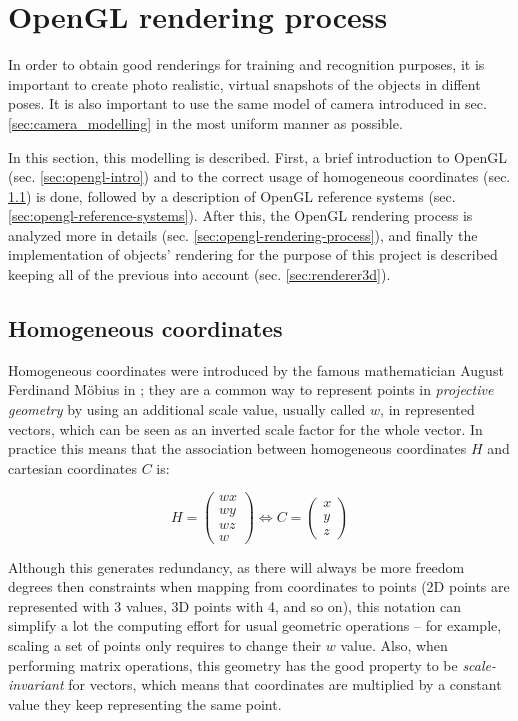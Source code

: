 \section{OpenGL rendering process} \label{sec:opengl-rendering}
In order to obtain good renderings for training and recognition purposes, it is
important to create photo realistic, virtual snapshots of the objects in
diffent poses. It is also important to use the same model of camera introduced in sec.
\ref{sec:camera_modelling} in the most uniform manner as possible.

In this section, this modelling is described. First, a brief
introduction to OpenGL (sec. \ref{sec:opengl-intro}) and to the correct usage of homogeneous coordinates (sec.
\ref{sec:homogeneous-coordinates}) is done, followed by a description of OpenGL reference systems (sec.
\ref{sec:opengl-reference-systems}). After this, the OpenGL rendering
process is analyzed more in details (sec. \ref{sec:opengl-rendering-process}), and finally the
implementation of objects' rendering for the purpose of this project is
described keeping all of the previous into account (sec. \ref{sec:renderer3d}).

\subsection{Homogeneous coordinates} \label{sec:homogeneous-coordinates}
Homogeneous coordinates were introduced by the famous mathematician August Ferdinand Möbius in
\cite{homogeneous-coordinates}; they are a common way to represent points in
\emph{projective geometry} by using an additional scale value, usually called
$w$, in represented
vectors, which can be seen as an inverted scale factor for the whole vector. In
practice this means that the association between homogeneous coordinates $H$ and
cartesian coordinates $C$ is:


\begin{equation}
H=\left(\begin{array}{c}wx\\wy\\wz\\w\end{array}\right) \Leftrightarrow
C=\left(\begin{array}{c}x\\y\\z\end{array}\right)
\end{equation}

Although this generates redundancy, as there will always be more freedom degrees
then constraints when mapping from coordinates to points (2D points are
represented with 3 values, 3D points with 4, and so on), this notation can
simplify a lot the computing effort for usual geometric operations -- for
example, scaling a set of points only requires to change their $w$ value.
Also, when performing matrix operations, this geometry has the good property to
be \emph{scale-invariant} for vectors, which means that coordinates are
multiplied by a constant value they keep representing the same point.

